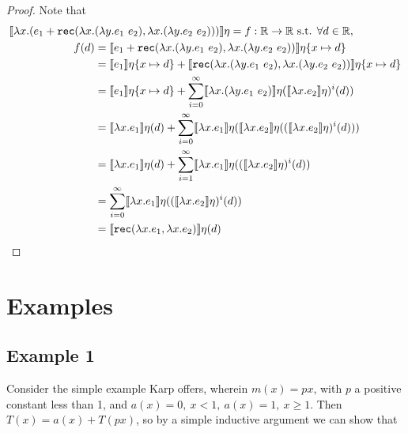  \begin{proof}
 Note that
 \begin{align*}
 \llbracket \lambda x.(e_1 + \texttt{rec}(\lambda x. &(\lambda y.e_1  \ e_2), \lambda x. (\lambda y.e_2 \ e_2))) \rrbracket \eta
 = f : \mathbb{R} \rightarrow \mathbb{R} \text{ s.t. } \forall d \in \mathbb{R}, \\
 f(d) &= \llbracket e_1 + \texttt{rec}(\lambda x. (\lambda y.e_1  \ e_2), \lambda x. (\lambda y.e_2 \ e_2)) \rrbracket \eta\{x 
 \mapsto d\} \\
 &= \llbracket e_1 \rrbracket\eta\{x \mapsto d\} + \llbracket \texttt{rec}(\lambda x. (\lambda y.e_1  \ e_2), \lambda x. (\lambda 
 y.e_2 \ e_2)) \rrbracket \eta\{x \mapsto d\} \\
 &=  \llbracket e_1 \rrbracket\eta\{x \mapsto d\} + \sum_{i=0}^\infty \llbracket \lambda x. (\lambda y.e_1  \ e_2) \rrbracket \eta
 	(\llbracket \lambda x.e_2 \rrbracket\eta)^i  (d))\\
&= \llbracket \lambda x.e_1\rrbracket\eta(d) + \sum_{i=0}^\infty \llbracket \lambda x.e_1 \rrbracket\eta (\llbracket \lambda x.e_2 \rrbracket\eta((\llbracket \lambda x.e_2\rrbracket\eta)^i(d))) \\
&= \llbracket \lambda x.e_1\rrbracket\eta(d) + \sum_{i=1}^\infty \llbracket \lambda x.e_1 \rrbracket\eta ((\llbracket \lambda x.e_2\rrbracket\eta)^i(d)) \\ 
&= \sum_{i=0}^\infty \llbracket \lambda x.e_1 \rrbracket\eta ((\llbracket \lambda x.e_2\rrbracket\eta)^i(d)) \\
&=  \llbracket \texttt{rec}(\lambda x.e_1, \lambda x.e_2) \rrbracket \eta (d)
\end{align*}
\end{proof}

\section{Examples}
\subsection{Example 1}
Consider the simple example Karp offers, wherein $m(x) = px$, with $p$ a
positive constant less than 1, and $a(x) = 0, \ x < 1, \ a(x) = 1, \ x \geq 1$.
Then $T(x) = a(x) + T(px)$, so by a simple inductive argument we can show that 

